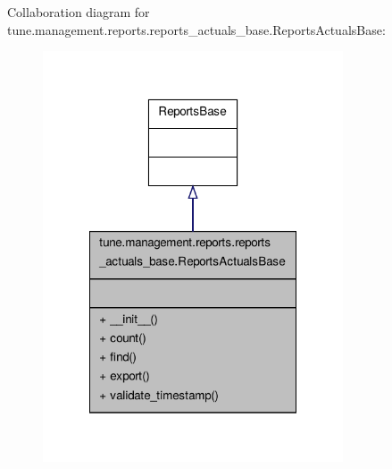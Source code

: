 Collaboration diagram for tune.\-management.\-reports.\-reports\-\_\-actuals\-\_\-base.\-Reports\-Actuals\-Base\-:
\nopagebreak
\begin{figure}[H]
\begin{center}
\leavevmode
\includegraphics[width=252pt]{classtune_1_1management_1_1reports_1_1reports__actuals__base_1_1ReportsActualsBase__coll__graph}
\end{center}
\end{figure}
